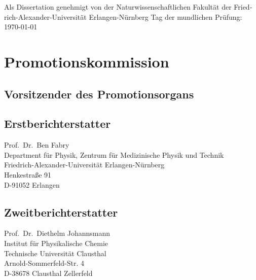 \begin{otherlanguage}{german}
Als Dissertation genehmigt von der Naturwissenschaftlichen Fakultät der
Friedrich-Alexander-Universität Erlangen-Nürnberg
\vspace{0.5cm}
Tag der mundlichen Prüfung: \today\\
\vspace{0.5cm}

\section*{Promotionskommission}
\subsection*{Vorsitzender des Promotionsorgans}

\subsection*{Erstberichterstatter}
Prof.~Dr.~Ben Fabry\\
Department für Physik, Zentrum für Medizinische Physik und Technik\\
Friedrich-Alexander-Universität Erlangen-Nürnberg\\
Henkestraße 91\\
D-91052 Erlangen
\subsection*{Zweitberichterstatter}
Prof.~Dr.~Diethelm Johannsmann\\
Institut für Physikalische Chemie\\
Technische Universität Clausthal\\
Arnold-Sommerfeld-Str. 4\\
D-38678 Clausthal Zellerfeld
\end{otherlanguage}
